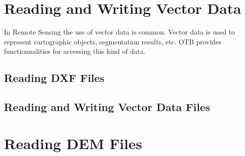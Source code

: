 

\section{Reading and Writing Vector Data}
\label{sec:ReadingVectorData}
In Remote Sensing the use of vector data is common. Vector data is
used to represent cartographic objects, segmentation results, etc. OTB
provides functionnalities for accessing this kind of data.



\subsection{Reading DXF Files}
\label{sec:ReadDXF}


\subsection{Reading and Writing Vector Data Files}
\label{sec:ReadVectorData}



\section{Reading DEM Files}
\label{sec:ReadDEM}

